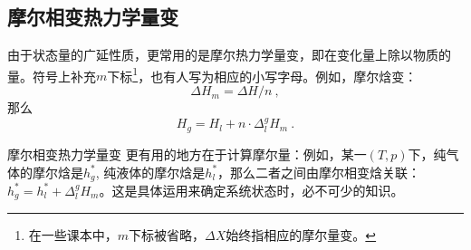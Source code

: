 \subsection{摩尔相变热力学量变}
由于状态量的广延性质，更常用的是摩尔热力学量变，即在变化量上除以物质的量。符号上补充$m$下标\footnote{在一些课本中，$m$下标被省略，$\Delta X$始终指相应的摩尔量变。}，也有人写为相应的小写字母。例如，摩尔焓变：
$$
\Delta H_m = \Delta H / n~,
$$
那么
$$
H_g = H_l + n \cdot \Delta^g_l H_m~.
$$

摩尔相变热力学量变 更有用的地方在于计算摩尔量：例如，某一$(T,p)$下，纯气体的摩尔焓是$h^*_g$, 纯液体的摩尔焓是$h^*_l$，那么二者之间由摩尔相变焓关联：$h^*_g = h^*_l + \Delta^g_l H_m$。这是具体运用来确定系统状态时，必不可少的知识。

